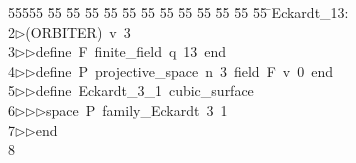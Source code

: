 %
%
\begin{tabbing}
55555 \= 55 \= 55 \= 55 \= 55 \= 55 \= 55 \= 55 \= 55 \= 55 \= 55 \= 55 \= 55 \= \>Eckardt\_13:\\[0pt]
2\>$\triangleright$\>(ORBITER)\ v\ 3\ \\[0pt]
3\>$\triangleright$\>$\triangleright$\>define\ F\ finite\_field\ q\ 13\ end\ \\[0pt]
4\>$\triangleright$\>$\triangleright$\>define\ P\ projective\_space\ n\ 3\ field\ F\ v\ 0\ end\ \\[0pt]
5\>$\triangleright$\>$\triangleright$\>define\ Eckardt\_3\_1\ cubic\_surface\ \\[0pt]
6\>$\triangleright$\>$\triangleright$\>$\triangleright$\>space\ P\ family\_Eckardt\ 3\ 1\ \\[0pt]
7\>$\triangleright$\>$\triangleright$\>end\\[0pt]
8\>\end{tabbing}
